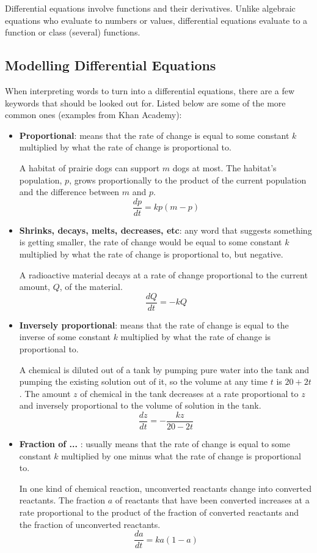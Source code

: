 \documentclass[12pt]{article}
\begin{document}
Differential equations involve functions and their derivatives. Unlike algebraic equations who evaluate to numbers or values, differential equations evaluate to a function or class (several) functions.

\subsection{Modelling Differential Equations}
When interpreting words to turn into a differential equations, there are a few keywords that should be looked out for. Listed below are some of the more common ones (examples from Khan Academy):

\begin{itemize}
    \item \textbf{Proportional}: means that the rate of change is equal to some constant $k$ multiplied by what the rate of change is proportional to.
          \bigskip

          \noindent A habitat of prairie dogs can support $m$ dogs at most. The habitat's population, $p$, grows proportionally to the product of the current population and the difference between $m$ and $p$.
          \[ \frac{dp}{dt} = kp(m-p) \]

    \item \textbf{Shrinks, decays, melts, decreases, etc}: any word that suggests something is getting smaller, the rate of change would be equal to some constant $k$ multiplied by what the rate of change is proportional to, but negative.
          \bigskip

          \noindent A radioactive material decays at a rate of change proportional to the current amount, $Q$, of the material.
          \[ \frac{dQ}{dt} = -kQ \]

    \item \textbf{Inversely proportional}: means that the rate of change is equal to the inverse of some constant $k$ multiplied by what the rate of change is proportional to.
          \bigskip

          \noindent A chemical is diluted out of a tank by pumping pure water into the tank and pumping the existing solution out of it, so the volume at any time $t$ is $20+2t$. The amount $z$ of chemical in the tank decreases at a rate proportional to $z$ and inversely proportional to the volume of solution in the tank.
          \[ \frac{dz}{dt} = -\frac{kz}{20-2t} \]

    \item \textbf{Fraction of ... }: usually means that the rate of change is equal to some constant $k$ multiplied by one minus what the rate of change is proportional to.
          \bigskip

          \noindent In one kind of chemical reaction, unconverted reactants change into converted reactants. The fraction $a$ of reactants that have been converted increases at a rate proportional to the product of the fraction of converted reactants and the fraction of unconverted reactants.
          \[ \frac{da}{dt} = ka(1-a) \]
\end{itemize}
\end{document}
